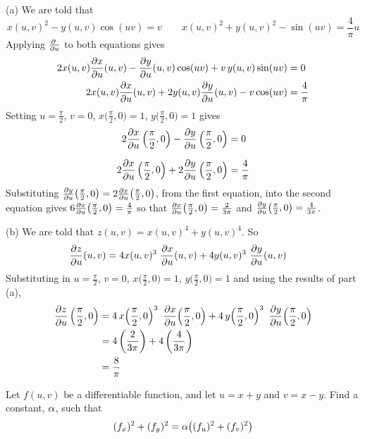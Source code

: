 \begin{solution}
(a) We are told that
\begin{equation*}
x(u,v)^2-y(u,v)\cos(uv)=v\qquad
x(u,v)^2+y(u,v)^2-\sin(uv)=\frac{4}{\pi}u
\end{equation*}
Applying $\pdiff{}{u}$ to both equations gives
\begin{align*}
2x(u,v)\pdiff{x}{u}(u,v)
-\pdiff{y}{u}(u,v)\cos(uv)+v\,y(u,v)\sin(uv)&=0 \\
2x(u,v)\pdiff{x}{u}(u,v)
   +2y(u,v)\pdiff{y}{u}(u,v)
   -v\cos(uv)&=\frac{4}{\pi}
\end{align*}
Setting $u=\frac{\pi}{2}$, $v=0$, $x\big(\frac{\pi}{2},0\big)=1$, 
$y\big(\frac{\pi}{2},0\big)=1$ gives
\begin{align*}
2\pdiff{x}{u}\left(\frac{\pi}{2},0\right)
-\pdiff{y}{u}\left(\frac{\pi}{2},0\right)&=0 \\[0.1in]
2\pdiff{x}{u}\left(\frac{\pi}{2},0\right)
   +2\pdiff{y}{u}\left(\frac{\pi}{2},0\right)
   &=\frac{4}{\pi}
\end{align*}
Substituting $\pdiff{y}{u}\big(\frac{\pi}{2},0\big)=2\pdiff{x}{u}\big(\frac{\pi}{2},0\big)$, 
from the first equation, into the second equation gives 
$6\pdiff{x}{u}\big(\frac{\pi}{2},0\big)=\frac{4}{\pi}$
so that
  $\pdiff{x}{u}\big(\frac{\pi}{2},0\big)=\frac{2}{3\pi}$ and
$\pdiff{y}{u}\big(\frac{\pi}{2},0\big)=\frac{4}{3\pi}$.

(b) 
We are told that $z(u,v)=x(u,v)^4+y(u,v)^4$. So
\begin{align*}
\pdiff{z}{u}(u,v)
&=4x(u,v)^3\ \pdiff{x}{u}(u,v)
+4y(u,v)^3\ \pdiff{y}{u}(u,v) 
\end{align*}
Substituting in $u=\frac{\pi}{2}$, $v=0$, $x\big(\frac{\pi}{2},0\big)=1$, 
$y\big(\frac{\pi}{2},0\big)=1$ and using the results of part (a),
\begin{align*}
\pdiff{z}{u}\left(\frac{\pi}{2},0\right)
&=4\,x\!\left(\frac{\pi}{2},0\right)^3\ 
       \pdiff{x}{u}\!\left(\frac{\pi}{2},0\right)
+4\,y\!\left(\frac{\pi}{2},0\right)^3\ 
       \pdiff{y}{u}\!\left(\frac{\pi}{2},0\right) \\
&=4\left(\frac{2}{3\pi}\right)
+4\left(\frac{4}{3\pi}\right) \\
&=\frac{8}{\pi}
\end{align*}
\end{solution}

\begin{question} [M200 2001A] %
Let $f(u,v)$ be a differentiable function, and let $u=x+y$
and $v=x-y$. Find a constant, $\alpha$, such that
\begin{align*}
(f_x)^2+(f_y)^2=\alpha\big((f_u)^2+(f_v)^2\big)
\end{align*}
\end{question}

